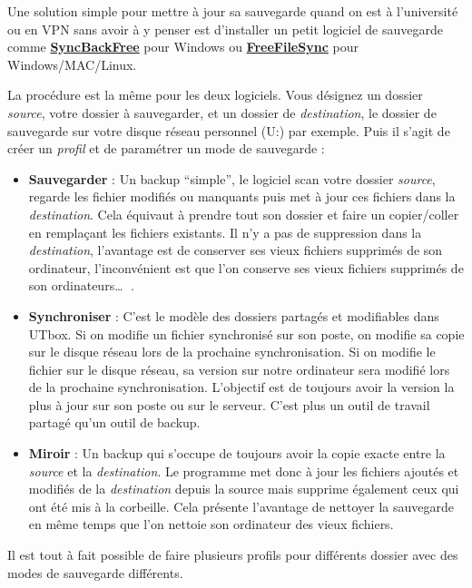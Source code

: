 \documentclass[
]{article}
\providecommand{\tightlist}{%
  \setlength{\itemsep}{0pt}\setlength{\parskip}{0pt}}
\begin{document}
Une solution simple pour mettre à jour sa sauvegarde quand on est à
l'université ou en VPN sans avoir à y penser est d'installer un petit
logiciel de sauvegarde comme
\href{https://www.2brightsparks.com/download-syncbackfree.html}{\textbf{SyncBackFree}}
pour Windows ou \href{https://freefilesync.org/}{\textbf{FreeFileSync}}
pour Windows/MAC/Linux.

La procédure est la même pour les deux logiciels. Vous désignez un
dossier \emph{source}, votre dossier à sauvegarder, et un dossier de
\emph{destination}, le dossier de sauvegarde sur votre disque réseau
personnel (U:) par exemple. Puis il s'agit de créer un \emph{profil} et
de paramétrer un mode de sauvegarde :

\begin{itemize}
\tightlist
\item
  \textbf{Sauvegarder} : Un backup ``simple'', le logiciel scan votre
  dossier \emph{source}, regarde les fichier modifiés ou manquants puis
  met à jour ces fichiers dans la \emph{destination}. Cela équivaut à
  prendre tout son dossier et faire un copier/coller en remplaçant les
  fichiers existants. Il n'y a pas de suppression dans la
  \emph{destination}, l'avantage est de conserver ses vieux fichiers
  supprimés de son ordinateur, l'inconvénient est que l'on conserve ses
  vieux fichiers supprimés de son ordinateurs\ldots{} 🤔.
\item
  \textbf{Synchroniser} : C'est le modèle des dossiers partagés et
  modifiables dans UTbox. Si on modifie un fichier synchronisé sur son
  poste, on modifie sa copie sur le disque réseau lors de la prochaine
  synchronisation. Si on modifie le fichier sur le disque réseau, sa
  version sur notre ordinateur sera modifié lors de la prochaine
  synchronisation. L'objectif est de toujours avoir la version la plus à
  jour sur son poste ou sur le serveur. C'est plus un outil de travail
  partagé qu'un outil de backup.
\item
  \textbf{Miroir} : Un backup qui s'occupe de toujours avoir la copie
  exacte entre la \emph{source} et la \emph{destination}. Le programme
  met donc à jour les fichiers ajoutés et modifiés de la
  \emph{destination} depuis la source mais supprime également ceux qui
  ont été mis à la corbeille. Cela présente l'avantage de nettoyer la
  sauvegarde en même temps que l'on nettoie son ordinateur des vieux
  fichiers.
\end{itemize}

Il est tout à fait possible de faire plusieurs profils pour différents
dossier avec des modes de sauvegarde différents.
\end{document}
